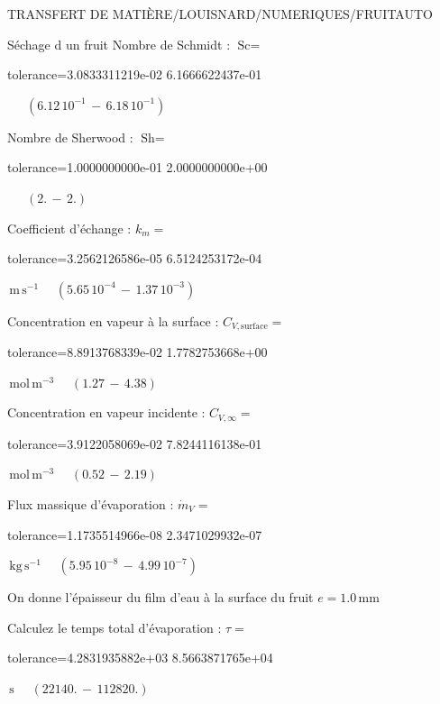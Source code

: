 \documentclass[12pt]{article}
\begin{document}
\begin{quiz}{TRANSFERT DE MATIÈRE/LOUISNARD/NUMERIQUES/FRUITAUTO}
\begin{cloze}{Séchage d un fruit}
Nombre de Schmidt : $\text{Sc} =  $
\begin{numerical}[points=1] 
\item[tolerance={3.0833311219e-02}] 6.1666622437e-01 
\end{numerical} 
 $\,$ 
 $ \quad ( 6.12 \, 10^{-1}  \, - \,  6.18 \, 10^{-1} ) $ 

Nombre de Sherwood : $\text{Sh} =  $
\begin{numerical}[points=2] 
\item[tolerance={1.0000000000e-01}] 2.0000000000e+00 
\end{numerical} 
 $\,$ 
 $ \quad (2. \, - \, 2.) $ 

Coefficient d'échange : $k_m =  $
\begin{numerical}[points=1] 
\item[tolerance={3.2562126586e-05}] 6.5124253172e-04 
\end{numerical} 
 $\,  \mathrm{m}\,  \mathrm{s}^{-1}$ 
 $ \quad ( 5.65 \, 10^{-4}  \, - \,  1.37 \, 10^{-3} ) $ 

Concentration en vapeur à la surface : $C_{V, \text{surface}} =  $
\begin{numerical}[points=2] 
\item[tolerance={8.8913768339e-02}] 1.7782753668e+00 
\end{numerical} 
 $\,  \mathrm{mol}\,  \mathrm{m}^{-3}$ 
 $ \quad (1.27 \, - \, 4.38) $ 

Concentration en vapeur incidente : $C_{V, \infty} =  $
\begin{numerical}[points=2] 
\item[tolerance={3.9122058069e-02}] 7.8244116138e-01 
\end{numerical} 
 $\,  \mathrm{mol}\,  \mathrm{m}^{-3}$ 
 $ \quad (0.52 \, - \, 2.19) $ 

Flux massique d'évaporation : $\dot{m}_V =  $
\begin{numerical}[points=1] 
\item[tolerance={1.1735514966e-08}] 2.3471029932e-07 
\end{numerical} 
 $\,  \mathrm{kg}\,  \mathrm{s}^{-1}$ 
 $ \quad ( 5.95 \, 10^{-8}  \, - \,  4.99 \, 10^{-7} ) $ 

 

On donne l'épaisseur du film d'eau à la surface du fruit $e = 1.0\,  \mathrm{mm} $

Calculez le temps total d'évaporation : $\tau =  $
\begin{numerical}[points=2] 
\item[tolerance={4.2831935882e+03}] 8.5663871765e+04 
\end{numerical} 
 $\,  \mathrm{s}$ 
 $ \quad (22140. \, - \, 112820.) $ 


\end{cloze}
\end{quiz}
\end{document}
